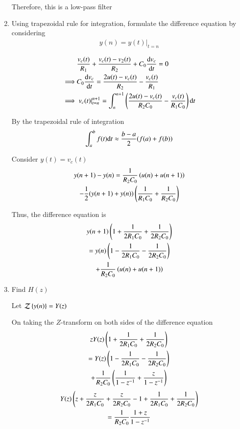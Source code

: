 \documentclass[journal,12pt,twocolumn]{IEEEtran}
\renewcommand\thesection{\arabic{section}}
\begin{document}
\begin{enumerate}[label=\thesection.\arabic*.,ref=\thesection.\theenumi]
    Therefore, this is a low-pass filter
    
    \item Using trapezoidal rule for integration, formulate the difference equation by considering 
    \begin{align}
        y(n) = y(t)\vert_{t=n}
    \end{align}
    
    \solution
    \begin{align}
        &\frac{v_c(t)}{R_1} + \frac{v_c(t) - v_2(t)}{R_2} + C_0\frac{\mathrm{d} v_c}{\mathrm{d} t} = 0 \\
        \implies &C_0\frac{\mathrm{d} v_c}{\mathrm{d} t} = \frac{2u(t)-v_c(t)}{R_2} - \frac{v_c(t)}{R_1} \\
        \implies &\left.v_c(t)\right|_{t=n}^{n+1} = \int_{n}^{n+1} \left(\frac{2u(t)-v_c(t)}{R_2C_0} - \frac{v_c(t)}{R_1C_0}\right) \mathrm{d} t
    \end{align}
    
    By the trapezoidal rule of integration
    \begin{align}
        \int_a^b f(t) \mathrm{d} t \approx \frac{b-a}{2} (f(a) + f(b))
    \end{align}
    
    Consider $y(t) = v_c(t)$
    \begin{multline}
        y(n+1) - y(n) = \frac{1}{R_2C_0}\left(u(n)+u(n+1)\right) \\
        - \frac12(y(n+1) + y(n))\left(\frac{1}{R_1C_0} + \frac{1}{R_2C_0}\right)
    \end{multline}
    
    Thus, the difference equation is
    \begin{multline}
        y(n+1) \left(1 + \frac{1}{2R_1C_0} + \frac{1}{2R_2C_0}\right) \\= y(n) \left(1 - \frac{1}{2R_1C_0} - \frac{1}{2R_2C_0}\right) \\+ \frac{1}{R_2C_0}\left(u(n)+u(n+1)\right)
    \end{multline}
    
    \item Find $H(z)$
    
    \solution Let ${\mathcal{Z}}\left\{y(n)\right\} = Y(z)$
    
    On taking the $Z$-transform on both sides of the difference equation
    \begin{multline}
        zY(z)\left(1 + \frac{1}{2R_1C_0} + \frac{1}{2R_2C_0}\right) \\= Y(z)\left(1 - \frac{1}{2R_1C_0} - \frac{1}{2R_2C_0}\right) \\+ \frac{1}{R_2C_0} \left(\frac{1}{1-z^{-1}} + \frac{z}{1-z^{-1}}\right)
    \end{multline}
    \begin{multline}
        Y(z)\left(z + \frac{z}{2R_1C_0} + \frac{z}{2R_2C_0} - 1 + \frac{1}{2R_1C_0} + \frac{1}{2R_2C_0}\right) \\
        = \frac{1}{R_2C_0} \frac{1+z}{1-z^{-1}}
    \end{multline}
    

\end{enumerate}
\end{document}
